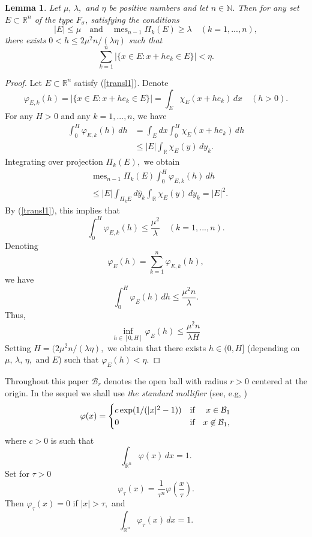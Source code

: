 \documentclass[12pt,twoside,reqno]{amsart}
\numberwithin{equation}{section}
\newtheorem{lem}[teo]{Lemma}
\theoremstyle{definition}
\numberwithin{equation}{section}
\begin{document}
\begin{lem}\label{TRANSLATION} Let $\mu, \,{\lambda },$ and $\eta$ be positive numbers and let $n\in {\mathbb{N}}.$
Then for any set $E\subset {\mathbb{R}}^n$ of the type $F_{\sigma}$, satisfying the
conditions
\begin{equation}\label{transl1}
|E|\le \mu\quad \mbox{and}\quad {\operatorname{mes}}_{n-1}\Pi_k (E)\ge {\lambda }\quad (k=1,...,n),
\end{equation}
there exists $0<h\le 2\mu^2n/({\lambda } \eta)$ such that
\begin{equation}\label{translation}
\sum_{k=1}^n|\{x\in E: x+he_k\in E\}|<\eta.
\end{equation}
\end{lem}
\begin{proof} Let $E\subset {\mathbb{R}}^n$  satisfy (\ref{transl1}). Denote
$$
{\varphi}_{E,k}(h)=|\{x\in E: x+he_k\in E\}|=\int_E\chi_E(x+he_k)\,dx\quad (h>0).
$$
For any $H>0$ and any $k=1,...,n$,  we have
$$
\begin{aligned}
\int_0^H{\varphi}_{E,k}(h)\,dh
&=\int_E dx\int_0^H\chi_E(x+he_k)\,dh\\
&\le |E|\int_{\mathbb{R}} \chi_E(y)\,dy_k.
\end{aligned}
$$
Integrating over projection $\Pi_k (E),$ we obtain
$$
\begin{aligned}
&{\operatorname{mes}}_{n-1}\Pi_k (E)\int_0^H{\varphi}_{E,k}(h)\,dh\\
&\le |E|\int_{\Pi_k E}d\widehat y_k\int_{\mathbb{R}}\chi_E(y)\,dy_k = |E|^2.
\end{aligned}
$$
 By (\ref{transl1}), this implies that
$$
\int_0^H{\varphi}_{E,k}(h)\le \frac{\mu^2}{\lambda }\quad (k=1,...,n).
$$
Denoting
$$
{\varphi}_E(h)=\sum_{k=1}^n{\varphi}_{E,k}(h),
$$
we have
$$
\int_0^H{\varphi}_E(h)\,dh\le \frac{\mu^2n}{\lambda }.
$$
Thus,
$$
\inf_{h\in [0,H]}{\varphi}_E(h)\le \frac{\mu^2n}{{\lambda } H}
$$
Setting $H=(2\mu^2n/({\lambda } \eta),$ we obtain that there exists
$h\in(0,H]$ (depending on $\mu,\,{\lambda },\,\eta,$ and $E$) such that
${\varphi}_E(h)<\eta.$
\end{proof}

Throughout this paper $\mathcal {B}_r$ denotes the open ball with
radius $r>0$ centered at the origin. In the sequel  we shall use
{\it the standard mollifier} (see, e.g, \cite[p. 553]{Leo1})
\begin{equation}\label{moll}
 {\varphi}(x)=\begin{cases}
    c \operatorname{exp}(1/(|x|^2-1)) &\textnormal{if }\quad x\in \mathcal {B}_1 \\
    0 &\textnormal{if}\quad x\not\in \mathcal {B}_1,
  \end{cases}
\end{equation}
where $c>0$ is such that
$$
\int_{{\mathbb{R}}^n} {\varphi}(x)\,dx=1.
$$
Set for $\tau >0$
\begin{equation}\label{moll2}
 {\varphi}_\tau(x)=\frac1{\tau^n}{\varphi}\left(\frac{x}{\tau}\right).
 \end{equation}
 Then ${\varphi}_\tau(x)=0$ if $|x|>\tau,$ and
 \begin{equation}\label{moll3}
 \int_{{\mathbb{R}}^n} {\varphi}_\tau(x)\,dx=1.
 \end{equation}
\end{document}
